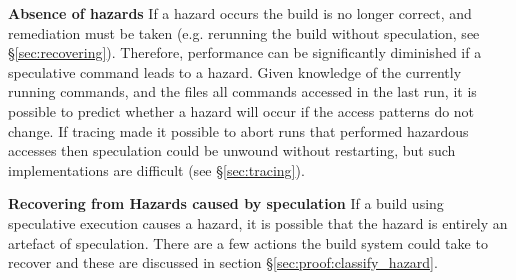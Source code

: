 \textbf{Absence of hazards} If a hazard occurs the build is no longer correct, and remediation must be taken (e.g. rerunning the build without speculation, see \S\ref{sec:recovering}). Therefore, performance can be significantly diminished if a speculative command leads to a hazard. Given knowledge of the currently running commands, and the files all commands accessed in the last run, it is possible to predict whether a hazard will occur if the access patterns do not change. If tracing made it possible to abort runs that performed hazardous accesses then speculation could be unwound without restarting, but such implementations are difficult (see \S\ref{sec:tracing}).

\textbf{Recovering from Hazards caused by speculation}
If a build using speculative execution causes a hazard, it is possible that the hazard is entirely an artefact of speculation. There are a few actions the build system could take to recover and these are discussed in section \S\ref{sec:proof:classify_hazard}.
